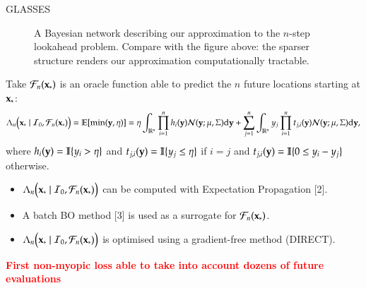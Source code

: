 \documentclass[15pt,serif,mathserif,final]{beamer}
\newcommand{\I}{\mathcal{I}}
\newcommand{\ud}{\mathrm{d}}
\newcommand{\E}{\mathbb{E}}
\newcommand{\N}{\mathcal{N}}
\newcommand{\future}{\mathcal{F}}
\newcommand{\IR}{\mathbb{R}}
\begin{document}
\begin{frame}{}
\begin{columns}[t]
\begin{column}{0.32\linewidth}
\begin{block}{GLASSES}
\begin{figure}[t!]
\caption{
    A Bayesian network describing our approximation to the $n$-step lookahead problem.  Compare with the figure above: the sparser structure renders our approximation computationally tractable. }
\label{fig:bayes_net_glasses}
\end{figure}

Take $\future_{n}(\latentVector_*)$ is an oracle function able to predict the $n$ future  locations starting at $\mathbf{x}_*$:
\begin{equation}\nonumber
\Lambda_n \bigl(\latentVector_* \mid \I_0, \future_{n}(\latentVector_*) \bigr)  =\E [\min (\dataVector,\eta)]  =  \eta\int_{\IR^n} \prod_{i=1}^nh_i(\dataVector) \N(\dataVector; \mu, \Sigma) \ud \dataVector + \sum_{j=1}^n  \int_{\IR^n} \dataScalar_j \prod_{i=1}^n t_{j,i}(\dataVector) \N(\dataVector; \mu, \Sigma) \ud \dataVector,
\end{equation}
 where  $h_i(\mathbf{y}) = \mathbb{I}\{y_i>\eta\}$ and $t_{j,i}(\mathbf{y}) = \mathbb{I}\{y_j \leq\eta\}$ if $i=j$ and 
$t_{j,i}(\mathbf{y}) =\mathbb{I}\{ 0 \leq y_i-y_j \}$ otherwise.

 \begin{itemize}
 \item $\Lambda_n \bigl(\latentVector_* \mid \I_0, \future_{n}(\latentVector_*) \bigr)$ can be computed with Expectation Propagation [2].
 \item A batch BO method [3] is used as a surrogate for $\future_{n}(\latentVector_*)$. 
 \item $\Lambda_n \bigl(\latentVector_* \mid \I_0, \future_{n}(\latentVector_*) \bigr)$ is optimised using a  gradient-free method (DIRECT).
 \end{itemize}
 
 \begin{center}
 \textcolor{red}{\textbf{First non-myopic loss able to take into account dozens of future evaluations}}
 \end{center}
 
\end{block}





    \end{column}%


\end{columns}
\end{frame}
\end{document}
